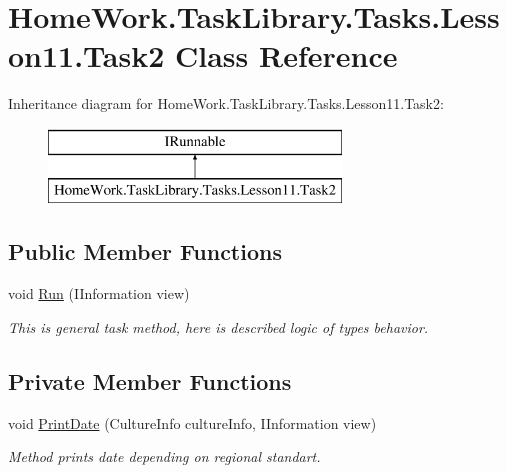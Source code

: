 \hypertarget{class_home_work_1_1_task_library_1_1_tasks_1_1_lesson11_1_1_task2}{}\section{Home\+Work.\+Task\+Library.\+Tasks.\+Lesson11.\+Task2 Class Reference}
\label{class_home_work_1_1_task_library_1_1_tasks_1_1_lesson11_1_1_task2}
Inheritance diagram for Home\+Work.\+Task\+Library.\+Tasks.\+Lesson11.\+Task2\+:\begin{figure}[H]
\begin{center}
\leavevmode
\includegraphics[height=2.000000cm]{class_home_work_1_1_task_library_1_1_tasks_1_1_lesson11_1_1_task2}
\end{center}
\end{figure}
\subsection*{Public Member Functions}
\begin{DoxyCompactItemize}
\item 
void \mbox{\hyperlink{class_home_work_1_1_task_library_1_1_tasks_1_1_lesson11_1_1_task2_ae21b65239ac0b09b9ce3c89dbf4d19ca}{Run}} (I\+Information view)
\begin{DoxyCompactList}\small\item\em This is general task method, here is described logic of types behavior. \end{DoxyCompactList}\end{DoxyCompactItemize}
\subsection*{Private Member Functions}
\begin{DoxyCompactItemize}
\item 
void \mbox{\hyperlink{class_home_work_1_1_task_library_1_1_tasks_1_1_lesson11_1_1_task2_a1446cdbc61211414a8aa651c26a4bb0b}{Print\+Date}} (Culture\+Info culture\+Info, I\+Information view)
\begin{DoxyCompactList}\small\item\em Method prints date depending on regional standart. \end{DoxyCompactList}\end{DoxyCompactItemize}


